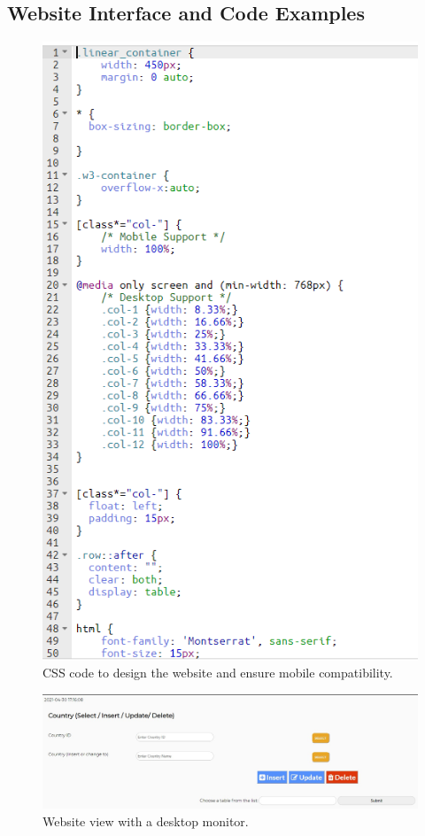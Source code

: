 \documentclass[openany]{article}
\begin{document}
\subsection{Website Interface and Code Examples}
		\begin{figure}[H]
			\includegraphics[width=\textwidth, height=\textheight, keepaspectratio]{css}
			\caption{CSS code to design the website and ensure mobile compatibility.}
		\end{figure}
		\begin{figure}[H]
			\includegraphics[width=\textwidth]{Country (PC view)}
			\caption{Website view with a desktop monitor.}
		\end{figure}
\end{document}

